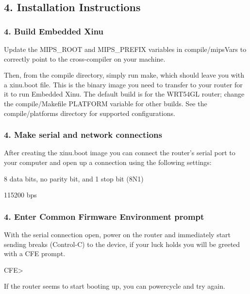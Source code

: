 \subsection*{4. Installation Instructions}

\subsubsection*{4. Build Embedded Xinu}

Update the {\ttfamily M\-I\-P\-S\-\_\-\-R\-O\-O\-T} and {\ttfamily M\-I\-P\-S\-\_\-\-P\-R\-E\-F\-I\-X} variables in compile/mips\-Vars to correctly point to the cross-\/compiler on your machine.

Then, from the compile directory, simply run make, which should leave you with a xinu.\-boot file. This is the binary image you need to transfer to your router for it to run Embedded Xinu. The default build is for the W\-R\-T54\-G\-L router; change the compile/\-Makefile {\ttfamily P\-L\-A\-T\-F\-O\-R\-M} variable for other builds. See the compile/platforms directory for supported configurations.

\subsubsection*{4. Make serial and network connections}

After creating the {\ttfamily xinu.\-boot} image you can connect the router's serial port to your computer and open up a connection using the following settings\-:


\begin{DoxyItemize}
\item 8 data bits, no parity bit, and 1 stop bit (8\-N1)
\item 115200 bps
\end{DoxyItemize}

\subsubsection*{4. Enter Common Firmware Environment prompt}

With the serial connection open, power on the router and immediately start sending breaks (Control-\/\-C) to the device, if your luck holds you will be greeted with a C\-F\-E prompt. \begin{DoxyVerb}CFE>
\end{DoxyVerb}


If the router seems to start booting up, you can powercycle and try again.

